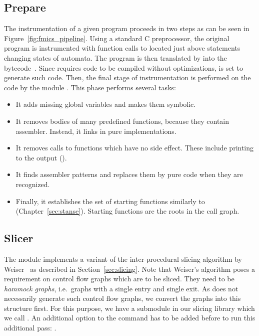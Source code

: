 \subsection{Prepare}
The instrumentation of a given program proceeds in two steps as can be seen in
Figure~\ref{fig:fmics_pipeline}. Using a standard C preprocessor, the original
program is instrumented with function calls to  located just
above statements changing states of automata.  The program is then translated
by \clang into the \llvm bytecode~\cite{llvm}. Since \klee requires \llvm code
to be compiled without optimizations, \clang is set to generate such code.
Then, the final stage of instrumentation is performed on the \llvm code by
the module . This phase performs several tasks:
\begin{itemize}
\item It adds missing global variables and makes them symbolic.
\item It removes bodies of many predefined functions, because they contain
assembler. Instead, it links in pure \llvm implementations.
\item It removes calls to functions which have no side effect. These include
printing to the output ().
\item It finds assembler patterns and replaces them by pure \llvm code when
they are recognized.

\item Finally, it establishes the set of starting functions similarly to \stan
(Chapter~\ref{sec:stanse}). Starting functions are the roots in the call
graph.

\end{itemize}

\subsection{Slicer}\label{sec:fmics_slicer}
The module  implements a variant of the inter-procedural
slicing algorithm by Weiser~\cite{slicing} as described in
Section~\ref{sec:slicing}. Note that Weiser's algorithm poses a requirement on
control flow graphs which are to be sliced. They need to be \emph{hammock
graphs}, i.e.\ graphs with a single entry and single exit. As \clang does not
necessarily generate such control flow graphs, we convert the graphs into this
structure first. For this purpose, we have a submodule in our slicing library
which we call . An additional option to the 
command has to be added before  to run this
additional pass: .

